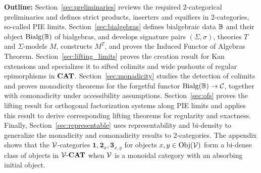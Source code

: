 \smallskip
\noindent\textbf{Outline:} Section~\ref{sec:preliminaries} reviews the required $2$-categorical preliminaries and defines strict products, inserters and equifiers in $2$-categories, so-called PIE limits. Section~\ref{sec:bialgebras} defines bialgebraic data $\mathbb{B}$ and their object $\mathrm{Bialg}(\mathbb{B})$ of bialgebras, and develops signature pairs $(\Sigma,\sigma)$, theories $T$ and $\Sigma$-models $M$, constructs $M^T$, and proves the Induced Functor of Algebras Theorem. Section~\ref{sec:lifting_limits} proves the creation result for Kan extensions and specializes it to sifted colimits and wide pushouts of regular epimorphisms in $\mathbf{CAT}$. Section~\ref{sec:monadicity} studies the detection of colimits and proves monadicity theorems for the forgetful functor $\mathrm{Bialg}(\mathbb{B})\to \mathcal{C}$, together with comonadicity under accessibility assumptions. Section~\ref{sec:ofs} proves the lifting result for orthogonal factorization systems along PIE limits and applies this result to derive corresponding lifting theorems for regularity and exactness. Finally, Section~\ref{sec:representable} uses representability and bi-density to generalize the monadicity and comonadicity results to $2$-categories. The appendix shows that the $\mathcal{V}$-categories $\textbf{1},\textbf{2}_x, \textbf{3}_{x,y}$ for objects $x,y\in \mathrm{Obj}(\mathcal{V})$ form a bi-dense class of objects in $\mathcal{V}\text{-}\mathbf{CAT}$ when $\mathcal{V}$ is a monoidal category with an absorbing initial object.